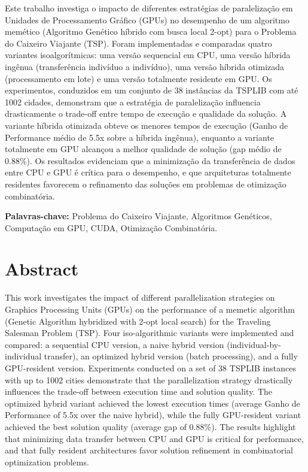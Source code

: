 Este trabalho investiga o impacto de diferentes estratégias de
paralelização em Unidades de Processamento Gráfico (GPUs) no desempenho
de um algoritmo memético (Algoritmo Genético híbrido com busca local
2-opt) para o Problema do Caixeiro Viajante (TSP). Foram implementadas e
comparadas quatro variantes isoalgorítmicas: uma versão sequencial em
CPU, uma versão híbrida ingênua (transferência indivíduo a indivíduo),
uma versão híbrida otimizada (processamento em lote) e uma versão
totalmente residente em GPU. Os experimentos, conduzidos em um conjunto
de 38 instâncias da TSPLIB com até 1002 cidades, demonstram que a
estratégia de paralelização influencia drasticamente o trade-off entre
tempo de execução e qualidade da solução. A variante híbrida otimizada
obteve os menores tempos de execução (Ganho de Performance médio de 5.5x
sobre a híbrida ingênua), enquanto a variante totalmente em GPU alcançou
a melhor qualidade de solução (gap médio de 0.88\%). Os resultados
evidenciam que a minimização da transferência de dados entre CPU e GPU é
crítica para o desempenho, e que arquiteturas totalmente residentes
favorecem o refinamento das soluções em problemas de otimização
combinatória.

\textbf{Palavras-chave:} Problema do Caixeiro Viajante, Algoritmos
Genéticos, Computação em GPU, CUDA, Otimização Combinatória.

\section*{Abstract}\label{abstract}

This work investigates the impact of different parallelization
strategies on Graphics Processing Units (GPUs) on the performance of a
memetic algorithm (Genetic Algorithm hybridized with 2-opt local search)
for the Traveling Salesman Problem (TSP). Four iso-algorithmic variants
were implemented and compared: a sequential CPU version, a naive hybrid
version (individual-by-individual transfer), an optimized hybrid version
(batch processing), and a fully GPU-resident version. Experiments
conducted on a set of 38 TSPLIB instances with up to 1002 cities
demonstrate that the parallelization strategy drastically influences the
trade-off between execution time and solution quality. The optimized
hybrid variant achieved the lowest execution times (average Ganho de
Performance of 5.5x over the naive hybrid), while the fully GPU-resident
variant achieved the best solution quality (average gap of 0.88\%). The
results highlight that minimizing data transfer between CPU and GPU is
critical for performance, and that fully resident architectures favor
solution refinement in combinatorial optimization problems.

